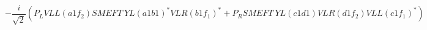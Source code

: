 %
\begin{dmath*}
%
  -  \frac{i}{\sqrt{2}} \left(P_L VLL\left(a1 f_2\right) SMEFT \  YL(a1 b1)^* VLR\left(b1 f_1\right)^* + P_R SMEFT \  YL(c1 d1) VLR\left(d1 f_2\right) VLL\left(c1 f_1\right)^*\right)
%
\end{dmath*}
%
